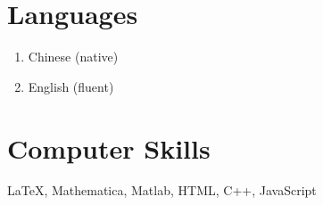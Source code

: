\documentclass[margin]{res}
\begin{document}
\begin{resume}
\section{Languages}
\begin{enumerate}[--]
\item Chinese (native)
\item English (fluent)
\end{enumerate}

\section{Computer Skills}
\LaTeX, Mathematica, Matlab, HTML, C++, JavaScript

\end{resume}
\end{document}
